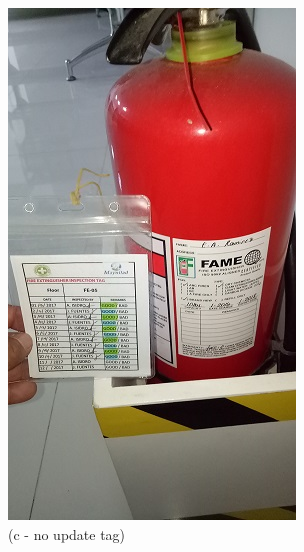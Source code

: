 \begin{figure}
\begin{minipage}[b]{0.22\linewidth}
			\includegraphics[width=\textwidth]{figures/R1P_safety/fex_no_update_tage.jpg}
		\caption*{(c - no update tag)}
	\end{minipage}
	\hspace{0.05cm}
\begin{minipage}[b]{0.22\linewidth}
	\centering

\end{minipage}
\end{figure}
